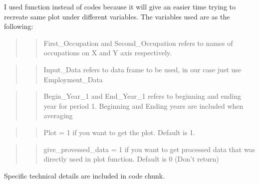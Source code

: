 \documentclass[
]{article}
\begin{document}
I used function instead of codes because it will give an easier time
trying to recreate same plot under different variables. The variables
used are as the following:

\begin{quote}
\begin{quote}
First\_Occupation and Second\_Occupation refers to names of occupations
on X and Y axis respectively.
\end{quote}
\end{quote}

\begin{quote}
\begin{quote}
Input\_Data refers to data frame to be used, in our case just use
Employment\_Data
\end{quote}
\end{quote}

\begin{quote}
\begin{quote}
Begin\_Year\_1 and End\_Year\_1 refers to beginning and ending year for
period 1. Beginning and Ending years are included when averaging
\end{quote}
\end{quote}

\begin{quote}
\begin{quote}
Plot = 1 if you want to get the plot. Default is 1.
\end{quote}
\end{quote}

\begin{quote}
\begin{quote}
give\_provessed\_data = 1 if you want to get processed data that was
directly used in plot function. Default is 0 (Don't return)
\end{quote}
\end{quote}

Specific technical details are included in code chunk.
\end{document}
